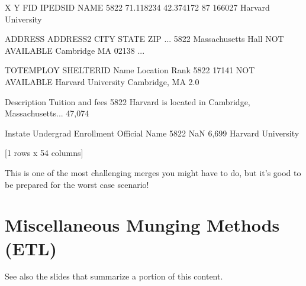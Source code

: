 \documentclass[letterpaper,10pt,english]{sphinxmanual}
\begin{document}
\begin{sphinxVerbatim}[commandchars=\\\{\}]
\PYG{p}{[}\PYG{p}{[}\PYG{p}{]}  \PYG{p}{]}
\end{sphinxVerbatim}

\begin{sphinxVerbatim}[commandchars=\\\{\}]
              X          Y  FID  IPEDSID                NAME  \PYGZbs{}
5822 \PYGZhy{}71.118234  42.374172   87   166027  Harvard University   

                 ADDRESS       ADDRESS2       CITY STATE    ZIP  ...  \PYGZbs{}
5822  Massachusetts Hall  NOT AVAILABLE  Cambridge    MA  02138  ...   

     TOT\PYGZus{}EMPLOY     SHELTER\PYGZus{}ID                Name       Location  Rank  \PYGZbs{}
5822      17141  NOT AVAILABLE  Harvard University  Cambridge, MA   2.0   

                                            Description  Tuition and fees  \PYGZbs{}
5822  Harvard is located in Cambridge, Massachusetts...          \PYGZdl{}47,074    

     In\PYGZhy{}state  Undergrad Enrollment       Official Name  
5822      NaN                 6,699  Harvard University  

[1 rows x 54 columns]
\end{sphinxVerbatim}

This is one of the most challenging merges you might have to do, but it’s good to be prepared for the worst case scenario!


\chapter{Miscellaneous Munging Methods (ETL)}
\label{\detokenize{chapter-13-etl:miscellaneous-munging-methods-etl}}\label{\detokenize{chapter-13-etl::doc}}
See also the slides that summarize a portion of this content.
\end{document}
